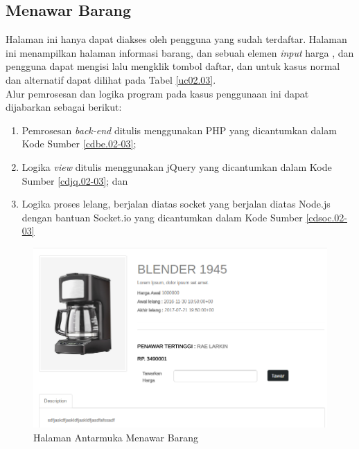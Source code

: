 \subsection{Menawar Barang}
Halaman ini hanya dapat diakses oleh pengguna yang sudah terdaftar. Halaman ini menampilkan halaman informasi barang, dan sebuah elemen \textit{input} harga , dan pengguna dapat mengisi lalu mengklik tombol daftar, dan untuk kasus normal dan alternatif dapat dilihat pada Tabel \ref{uc02.03}.\\
\indent Alur pemrosesan dan logika program pada kasus penggunaan ini dapat dijabarkan sebagai berikut:
	\begin{enumerate}
		\item Pemrosesan \textit{back-end} ditulis menggunakan PHP yang dicantumkan dalam Kode Sumber \ref{cdbe.02-03}; 
		\item Logika \textit{view} ditulis menggunakan jQuery yang dicantumkan dalam Kode Sumber \ref{cdjq.02-03}; dan
		\item Logika proses lelang, berjalan diatas socket yang berjalan diatas Node.js dengan bantuan Socket.io yang dicantumkan dalam Kode Sumber \ref{cdsoc.02-03}
	\end{enumerate}

\begin{figure}[h]
    \centering
    \includegraphics[width=\textwidth]{images/bab4/ui/02-03.png}
    \caption{Halaman Antarmuka Menawar Barang}
    \label{ui.02-03}
\end{figure}
\newpage

